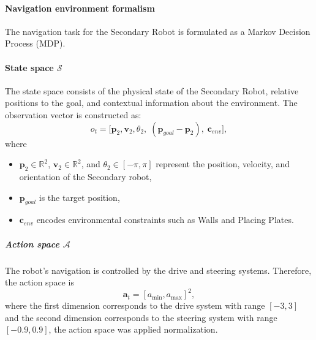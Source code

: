 \documentclass[english, 12pt, a4paper, elec, utf8, a-2b, online]{aaltothesis}
\begin{document}
\paragraph{Navigation environment formalism}

The navigation task for the Secondary Robot is formulated as a Markov Decision Process (MDP).

\paragraph{State space $\mathcal{S}$}
The state space consists of the physical state of the Secondary Robot, relative positions to the goal, and contextual information about the environment. The observation vector is constructed as:
\[
o_t = \big[ \mathbf{p}_2, \mathbf{v}_2, \theta_2, \; (\mathbf{p}_{goal} - \mathbf{p}_2), \; \mathbf{c}_{env} \big] ,
\]
where
\begin{itemize}
    \item $\mathbf{p}_2 \in \mathbb{R}^2$, $\mathbf{v}_2 \in \mathbb{R}^2$, and $\theta_2 \in [-\pi,\pi]$ represent the position, velocity, and orientation of the Secondary robot,
    \item $\mathbf{p}_{goal}$ is the target position,
    \item $\mathbf{c}_{env}$ encodes environmental constraints such as Walls and Placing Plates.
\end{itemize}


\subparagraph{Action space $\mathcal{A}$}
The robot's navigation is controlled by the drive and steering systems. Therefore, the action space is
\begin{equation}
\mathbf{a}_t = [a_{\min}, a_{\max}]^{2},
\end{equation}
where the first dimension corresponds to the drive system with range $[-3, 3]$ and the second dimension corresponds to the steering system with range $[-0.9, 0.9]$, the action space was applied normalization.
\end{document}
